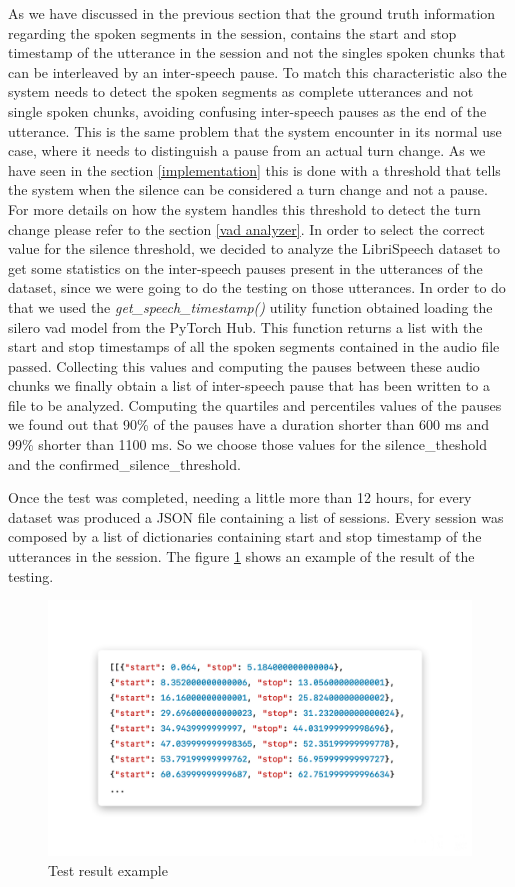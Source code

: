 \documentclass[../main.tex]{subfiles}
\begin{document}
As we have discussed in the previous section that the ground truth information regarding the spoken segments in the session, contains the start and stop timestamp of the utterance in the session and not the singles spoken chunks that can be interleaved by an inter-speech pause. To match this characteristic also the system needs to detect the spoken segments as complete utterances and not single spoken chunks, avoiding confusing inter-speech pauses as the end of the utterance. This is the same problem that the system encounter in its normal use case, where it needs to distinguish a pause from an actual turn change. As we have seen in the section \ref{implementation} this is done with a threshold that tells the system when the silence can be considered a turn change and not a pause. For more details on how the system handles this threshold to detect the turn change please refer to the section \ref{vad analyzer}. In order to select the correct value for the silence threshold, we decided to analyze the LibriSpeech dataset to get some statistics on the inter-speech pauses present in the utterances of the dataset, since we were going to do the testing on those utterances. In order to do that we used the \textit{get\_speech\_timestamp()}
utility function obtained loading the silero vad model from the PyTorch Hub. This function returns a list with the start and stop timestamps of all the spoken segments contained in the audio file passed. Collecting this values and computing the pauses between these audio chunks we finally obtain a list of inter-speech pause that has been written to a file to be analyzed. Computing the quartiles and percentiles values of the pauses we found out that 90\% of the pauses have a duration shorter than 600 ms and 99\% shorter than 1100 ms. So we choose those values for the silence\_theshold and the confirmed\_silence\_threshold.

Once the test was completed, needing a little more than 12 hours, for every dataset was produced a JSON file containing a list of sessions. Every session was composed by a list of dictionaries containing start and stop timestamp of the utterances in the session. The figure \ref{fig:test-result} shows an example of the result of the testing.

\begin{figure}[ht]
    \centering
    \includegraphics[width=\textwidth]{images/test-result.png}
    \caption{Test result example}
    \label{fig:test-result}
\end{figure}
\end{document}
